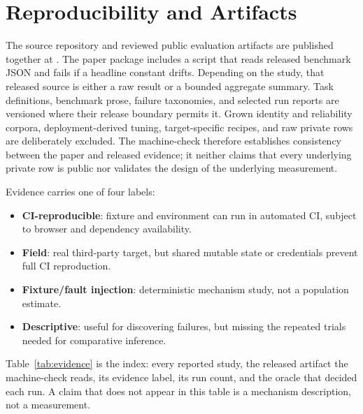 \section{Reproducibility and Artifacts}

The source repository and reviewed public evaluation artifacts are published
together \cite{openadaptartifact} at \artifacturl{}. The paper package includes
a script that reads released benchmark JSON and fails if a headline constant
drifts. Depending on the study, that released source is either a raw result or a
bounded aggregate summary. Task definitions, benchmark prose, failure
taxonomies, and selected run reports are versioned where their release boundary
permits it. Grown identity and reliability corpora, deployment-derived tuning,
target-specific recipes, and raw private rows are deliberately excluded. The
machine-check therefore establishes consistency between the paper and released
evidence; it neither claims that every underlying private row is public nor
validates the design of the underlying measurement.

Evidence carries one of four labels:
\begin{itemize}
  \item \textbf{CI-reproducible}: fixture and environment can run in automated
        CI, subject to browser and dependency availability.
  \item \textbf{Field}: real third-party target, but shared mutable state or
        credentials prevent full CI reproduction.
  \item \textbf{Fixture/fault injection}: deterministic mechanism study, not a
        population estimate.
  \item \textbf{Descriptive}: useful for discovering failures, but missing the
        repeated trials needed for comparative inference.
\end{itemize}

Table~\ref{tab:evidence} is the index: every reported study, the released
artifact the machine-check reads, its evidence label, its run count, and the
oracle that decided each run. A claim that does not appear in this table is a
mechanism description, not a measurement.

